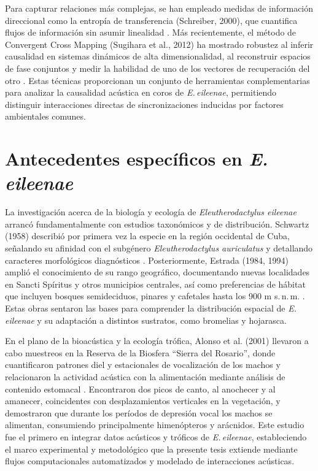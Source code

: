 Para capturar relaciones más complejas, se han empleado medidas de 
información direccional como la entropía de transferencia 
(Schreiber, 2000), que cuantifica flujos de información sin 
asumir linealidad \cite{schreiber2000measuring}. Más recientemente, el 
método de Convergent Cross Mapping (Sugihara et al., 2012) ha 
mostrado robustez al inferir causalidad en sistemas dinámicos de 
alta dimensionalidad, al reconstruir espacios de fase conjuntos 
y medir la habilidad de uno de los vectores de recuperación del 
otro \cite{sugihara2012detecting}. Estas técnicas proporcionan un 
conjunto de herramientas complementarias para analizar la 
causalidad acústica en coros de \emph{E.\,eileenae}, permitiendo 
distinguir interacciones directas de sincronizaciones inducidas 
por factores ambientales comunes.

\section{Antecedentes específicos en \emph{E.\,eileenae}}
\label{sec:antecedentes_eileenae}

La investigación acerca de la biología y ecología de 
\emph{Eleutherodactylus eileenae} arrancó fundamentalmente con 
estudios taxonómicos y de distribución. Schwartz (1958) 
describió por primera vez la especie en la región occidental de 
Cuba, señalando su afinidad con el subgénero 
\emph{Eleutherodactylus auriculatus} y detallando caracteres 
morfológicos diagnósticos \cite{schwartz1958new}. Posteriormente, 
Estrada (1984, 1994) amplió el conocimiento de su rango 
geográfico, documentando nuevas localidades en Sancti Spíritus 
y otros municipios centrales, así como preferencias de hábitat 
que incluyen bosques semideciduos, pinares y cafetales hasta 
los 900 m s.\,n.\,m. \cite{estrada1984nuevas,estrada1994herpetofauna}. 
Estas obras sentaron las bases para comprender la distribución 
espacial de \emph{E.\,eileenae} y su adaptación a distintos 
sustratos, como bromelias y hojarasca.

En el plano de la bioacústica y la ecología trófica, Alonso et 
al. (2001) llevaron a cabo muestreos en la Reserva de la 
Biosfera “Sierra del Rosario”, donde cuantificaron patrones 
diel y estacionales de vocalización de los machos y 
relacionaron la actividad acústica con la alimentación mediante 
análisis de contenido estomacal \cite{alonso2001patrones}. Encontraron 
dos picos de canto, al anochecer y al amanecer, coincidentes 
con desplazamientos verticales en la vegetación, y demostraron 
que durante los períodos de depresión vocal los machos se 
alimentan, consumiendo principalmente himenópteros y arácnidos. 
Este estudio fue el primero en integrar datos acústicos y 
tróficos de \emph{E.\,eileenae}, estableciendo el marco 
experimental y metodológico que la presente tesis extiende 
mediante flujos computacionales automatizados y modelado de 
interacciones acústicas.
















